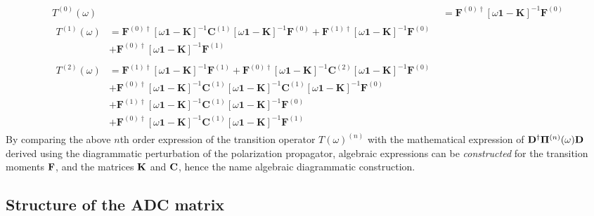 \begin{align}
T^{(0)}(\omega) &= \mathbf{F}^{(0)\dagger} \left[ \omega \mathbf{1} - \mathbf{K} \right]^{-1} \mathbf{F}^{(0)} \\
\begin{split}
T^{(1)}(\omega) &= \mathbf{F}^{(0)\dagger} \left[ \omega \mathbf{1} - \mathbf{K} \right]^{-1} \mathbf{C}^{(1)} \left[ \omega \mathbf{1} - \mathbf{K} \right]^{-1} \mathbf{F}^{(0)} + \mathbf{F}^{(1)\dagger} \left[ \omega \mathbf{1} - \mathbf{K} \right]^{-1} \mathbf{F}^{(0)} \\
&+ \mathbf{F}^{(0)\dagger} \left[ \omega \mathbf{1} - \mathbf{K} \right]^{-1} \mathbf{F}^{(1)} 
\end{split} 
\\
\begin{split}
T^{(2)}(\omega) &= \mathbf{F}^{(1)\dagger} \left[ \omega \mathbf{1} - \mathbf{K} \right]^{-1} \mathbf{F}^{(1)} + \mathbf{F}^{(0)\dagger} \left[ \omega \mathbf{1} - \mathbf{K} \right]^{-1} \mathbf{C}^{(2)} \left[ \omega \mathbf{1} - \mathbf{K} \right]^{-1} \mathbf{F}^{(0)} \\
&+ \mathbf{F}^{(0)\dagger} \left[ \omega \mathbf{1} - \mathbf{K} \right]^{-1} \mathbf{C}^{(1)} \left[ \omega \mathbf{1} - \mathbf{K} \right]^{-1} \mathbf{C}^{(1)} \left[ \omega \mathbf{1} - \mathbf{K} \right]^{-1} \mathbf{F}^{(0)} \\
&+ \mathbf{F}^{(1)\dagger} \left[ \omega \mathbf{1} - \mathbf{K} \right]^{-1} \mathbf{C}^{(1)} \left[ \omega \mathbf{1} - \mathbf{K} \right]^{-1} \mathbf{F}^{(0)} \\
&+ \mathbf{F}^{(0)\dagger} \left[ \omega \mathbf{1} - \mathbf{K} \right]^{-1} \mathbf{C}^{(1)} \left[ \omega \mathbf{1} - \mathbf{K} \right]^{-1} \mathbf{F}^{(1)}
\end{split}
\end{align}
\noindent By comparing the above $n$th order expression of the transition operator $T(\omega)^{(n)}$ with the mathematical expression of $\mathbf{D}^{\dagger} \mathbf{\Pi}^{(n)}(\omega) \mathbf{D}$ derived using the diagrammatic perturbation of the polarization propagator, algebraic expressions can be \emph{constructed} for the transition moments $\mathbf{F}$, and the matrices $\mathbf{K}$ and $\mathbf{C}$, hence the name algebraic diagrammatic construction.

\subsection{Structure of the ADC matrix}

